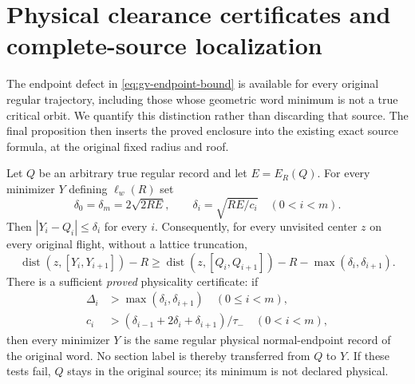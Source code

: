 \section{Physical clearance certificates and complete-source localization}
\label{sec:gv-source}
The endpoint defect in \eqref{eq:gv-endpoint-bound} is available for
every original regular trajectory, including those whose geometric
word minimum is not a true critical orbit. We quantify this distinction
rather than discarding that source. The final proposition then inserts
the proved enclosure into the existing exact source formula, at the
original fixed radius and roof.

\begin{theorem}
\label{thm:gv-clearance-certificate}
Let $Q$ be an arbitrary true regular record and let $E=E_R(Q)$.
For every minimizer $Y$ defining $\ell_w(R)$ set
\[
 \delta_0=\delta_m=2\sqrt{2RE},\qquad
 \delta_i=\sqrt{RE/c_i}\quad(0<i<m).
\]
Then $|Y_i-Q_i|\le\delta_i$ for every $i$. Consequently, for every
unvisited center $z$ on every original flight, without a lattice
truncation,
\begin{equation}\label{eq:gv-clearance-certificate}
 \operatorname{dist}(z,[Y_i,Y_{i+1}])-R
 \ge\operatorname{dist}(z,[Q_i,Q_{i+1}])-R
                    -\max(\delta_i,\delta_{i+1}).
\end{equation}
There is a sufficient \emph{proved} physicality certificate: if
\begin{align}
 \Delta_i&>\max(\delta_i,\delta_{i+1})\quad(0\le i<m),
                                                     \label{eq:gv-clearance-test}\\
 c_i&>(\delta_{i-1}+2\delta_i+\delta_{i+1})/\tau_-
                      \quad(0<i<m),                 \label{eq:gv-incidence-test}
\end{align}
then every minimizer $Y$ is the same regular physical normal-endpoint
record of the original word. No section label is thereby transferred
from $Q$ to $Y$. If these tests fail, $Q$ stays in the original source;
its minimum is not declared physical.
\end{theorem}
